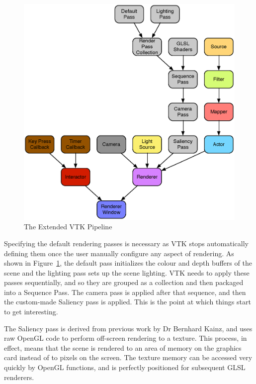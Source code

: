 \documentclass[MSc,paper=a4,pagesize=auto]{icldt}
\begin{document}
\begin{figure}[htbp!]
    \centering
    \includegraphics[width=1\textwidth]{resources/vtk_extended_pipeline}
    \caption{The Extended VTK Pipeline}
    \label{fig:vtk_extended_pipeline}
\end{figure}

Specifying the default rendering passes is necessary as VTK stops automatically defining them once the user manually configure any aspect of rendering. As shown in Figure~\ref{fig:vtk_extended_pipeline}, the default pass initializes the colour and depth buffers of the scene and the lighting pass sets up the scene lighting. VTK needs to apply these passes sequentially, and so they are grouped as a collection and then packaged into a Sequence Pass. The camera pass is applied after that sequence, and then the custom-made Saliency pass is applied. This is the point at which things start to get interesting.

The Saliency pass is derived from previous work by Dr Bernhard Kainz, and uses raw OpenGL code to perform off-screen rendering to a texture. This process, in effect, means that the scene is rendered to an area of memory on the graphics card instead of to pixels on the screen. The texture memory can be accessed very quickly by OpenGL functions, and is perfectly positioned for subsequent GLSL renderers.
\end{document}
